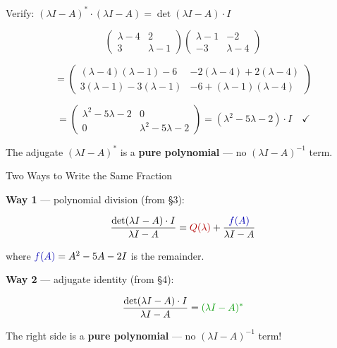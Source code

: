 \documentclass[10pt]{beamer}
\theoremstyle{definition}
\newcommand{\x}[1]{\alert{\textbf{#1}}}
\newcommand{\rd}[1]{{\color{red!70!black}#1}}
\newcommand{\bl}[1]{{\color{blue!70!black}#1}}
\newcommand{\gn}[1]{{\color{green!60!black}#1}}
\begin{document}
\begin{frame}{Verify: $(\lambda I-A)^* \cdot (\lambda I-A) = \det(\lambda I-A) \cdot I$}

\vfill

$$\begin{pmatrix}\lambda-4&2\\3&\lambda-1\end{pmatrix}\begin{pmatrix}\lambda-1&-2\\-3&\lambda-4\end{pmatrix}$$

\vfill

$$= \begin{pmatrix}(\lambda\!-\!4)(\lambda\!-\!1)-6 & -2(\lambda\!-\!4)+2(\lambda\!-\!4) \\ 3(\lambda\!-\!1)-3(\lambda\!-\!1) & -6+(\lambda\!-\!1)(\lambda\!-\!4)\end{pmatrix}$$

\vfill

$$= \begin{pmatrix}\lambda^2-5\lambda-2 & 0 \\ 0 & \lambda^2-5\lambda-2\end{pmatrix} = (\lambda^2 - 5\lambda - 2) \cdot I \quad \checkmark$$

\vfill

The adjugate $(\lambda I-A)^*$ is a \x{pure polynomial} --- no $(\lambda I - A)^{-1}$ term.

\vfill
\end{frame}


\begin{frame}{Two Ways to Write the Same Fraction}

\x{Way 1} --- polynomial division (from \S 3):

$$\frac{\det(\lambda I-A) \cdot I}{\lambda I - A} = \rd{Q(\lambda)} + \frac{\bl{f(A)}}{\lambda I - A}$$

where $\bl{f(A)} = A^2 - 5A - 2I$ is the remainder.

\vfill

\x{Way 2} --- adjugate identity (from \S 4):

$$\frac{\det(\lambda I - A) \cdot I}{\lambda I - A} = \gn{(\lambda I - A)^*}$$

\vfill

The right side is a \x{pure polynomial} --- no $(\lambda I-A)^{-1}$ term!

\vfill
\end{frame}
\end{document}
